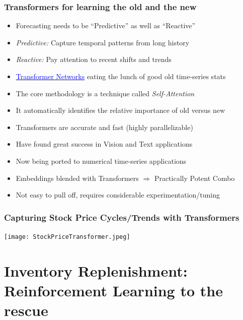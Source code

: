 \documentclass[handout]{beamer}
\begin{document}
\begin{frame}
\frametitle{Transformers for learning the old and the new}
\pause
\begin{itemize}[<+->]
\item Forecasting needs to be ``Predictive'' as well as ``Reactive''
\item {\em Predictive:} Capture temporal patterns from long history
\item {\em Reactive:} Pay attention to recent shifts and trends
\item \href{https://en.wikipedia.org/wiki/Transformer_(machine_learning_model)}{\underline{\textcolor{blue}{Transformer Networks}}} eating the lunch of good old time-series stats
\item The core methodology is a technique called {\em Self-Attention}
\item It automatically identifies the relative importance of old versus new
\item Transformers are accurate and fast (highly parallelizable)
\item Have found great success in Vision and Text applications
\item Now being ported to numerical time-series applications
\item Embeddings blended with Transformers $\Rightarrow$ Practically Potent Combo
\item Not easy to pull off, requires considerable experimentation/tuning
\end{itemize}
\end{frame}

\begin{frame}
\frametitle{Capturing Stock Price Cycles/Trends with Transformers}
\texttt{[image: StockPriceTransformer.jpeg]}
\end{frame}

\section{Inventory Replenishment: Reinforcement Learning to the rescue}
\end{document}
